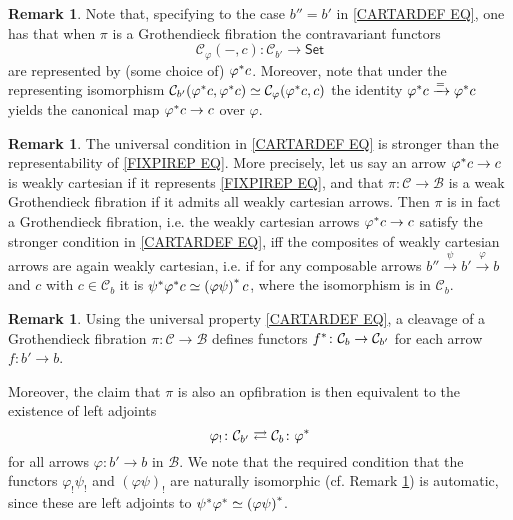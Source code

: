 \documentclass[a4paper,10pt
,draft
]{article}%
\numberwithin{equation}{section}
\numberwithin{figure}{section}
\theoremstyle{definition} %
\newtheorem{remark}[equation]{Remark}%
\newcommand{\1}{\ensuremath{\mathbbm 1}}%
\begin{document}
\begin{remark}\label{CARTCHAR REM}
Note that, specifying to the case $b'' = b'$ in 
\eqref{CARTARDEF EQ},
one has that when $\pi$ is a Grothendieck fibration the contravariant functors
\begin{equation}\label{FIXPIREP EQ}
\mathcal{C}_{\varphi}(-,c)
\colon
\mathcal{C}_{b'} 
\to
\mathsf{Set}
\end{equation}
are represented by (some choice of) $\varphi^{\**}c$.
Moreover, note that under the representing isomorphism
$\mathcal{C}_{b'}(\varphi^{\**}c,\varphi^{\**}c)
\simeq \mathcal{C}_{\varphi}(\varphi^{\**}c,c)$
the identity
$\varphi^{\**}c \xrightarrow{=} \varphi^{\**}c$
yields the canonical map
$\varphi^{\**}c \to c$ over $\varphi$.
\end{remark}


\begin{remark}\label{COMPSEMI REM}
The universal condition in \eqref{CARTARDEF EQ}
is stronger than the representability of 
\eqref{FIXPIREP EQ}.
More precisely, let us say an arrow 
$\varphi^{\**}c \to c$
is weakly cartesian if it represents \eqref{FIXPIREP EQ},
and that  
$\pi \colon \mathcal{C} \to \mathcal{B}$
is a weak Grothendieck fibration if it admits all weakly cartesian arrows.
Then $\pi$ is in fact a Grothendieck fibration,
i.e. the weakly cartesian arrows 
$\varphi^{\**}c \to c$
satisfy the stronger condition in \eqref{CARTARDEF EQ},
iff the composites of weakly cartesian arrows are again weakly cartesian, 
i.e. if 
for any composable arrows
$b'' \xrightarrow{\psi} b' \xrightarrow{\varphi} b$
and $c$ with $c \in \mathcal{C}_b$ it is
$\psi^{\**} \varphi^{\**} c \simeq 
\left( \varphi \psi \right)^{\**} c$,
where the isomorphism is in $\mathcal{C}_b$.
\end{remark}



\begin{remark}\label{ALSOOPADJ REM}
Using the universal property \eqref{CARTARDEF EQ},
a cleavage of a Grothendieck fibration 
$\pi \colon \mathcal{C} \to \mathcal{B}$
defines functors
$f^{\**} \colon \mathcal{C}_b \to \mathcal{C}_{b'}$
for each arrow $f \colon b' \to b$.

Moreover, 
the claim that $\pi$ is also an opfibration is then equivalent to the existence of left adjoints
\[
	\varphi_! \colon
	\mathcal{C}_{b'}
	\rightleftarrows
	\mathcal{C}_{b}
	\colon \varphi^{\**}
\]
for all arrows $\varphi \colon b' \to b$ in $\mathcal{B}$.
%
We note that the required condition that the functors
$\varphi_! \psi_!$ and
$(\varphi \psi)_!$
are naturally isomorphic (cf. Remark \ref{COMPSEMI REM})
is automatic, 
since these are left adjoints to 
$\psi^{\**} \varphi^{\**} \simeq 
\left( \varphi \psi \right)^{\**}$.
\end{remark}
\end{document}
